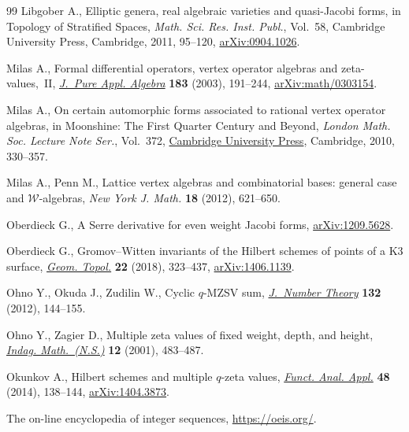 \documentclass[pdftex]{sigma}
\numberwithin{equation}{section}
\theoremstyle{definition}
\begin{document}
\begin{thebibliography}{99}
Libgober A., Elliptic genera, real algebraic varieties and quasi-{J}acobi
 forms, in Topology of Stratified Spaces, \textit{Math. Sci. Res. Inst.
 Publ.}, Vol.~58, Cambridge University Press, Cambridge, 2011, 95--120,
 \href{https://arxiv.org/abs/0904.1026}{arXiv:0904.1026}.

Milas A., Formal differential operators, vertex operator algebras and
 zeta-values,~{II},
 \href{https://doi.org/10.1016/S0022-4049(03)00036-7}{\textit{J.~Pure Appl.
 Algebra}} \textbf{183} (2003), 191--244,
 \href{https://arxiv.org/abs/math/0303154}{arXiv:math/0303154}.

Milas A., On certain automorphic forms associated to rational vertex operator
 algebras, in Moonshine: The First Quarter Century and Beyond, \textit{London
 Math. Soc. Lecture Note Ser.}, Vol.~372,
 \href{https://doi.org/10.1017/CBO9780511730054.016}{Cambridge University
 Press}, Cambridge, 2010, 330--357.

Milas A., Penn M., Lattice vertex algebras and combinatorial bases: general
 case and {$\mathcal W$}-algebras, \textit{New York J. Math.} \textbf{18}
 (2012), 621--650.

Oberdieck G., A {S}erre derivative for even weight {J}acobi forms,
 \href{https://arxiv.org/abs/1209.5628}{arXiv:1209.5628}.

Oberdieck G., Gromov--{W}itten invariants of the {H}ilbert schemes of points of
 a {K}3 surface, \href{https://doi.org/10.2140/gt.2018.22.323}{\textit{Geom.
 Topol.}} \textbf{22} (2018), 323--437,
 \href{https://arxiv.org/abs/1406.1139}{arXiv:1406.1139}.

Ohno Y., Okuda J., Zudilin W., Cyclic {$q$}-{MZSV} sum,
 \href{https://doi.org/10.1016/j.jnt.2011.08.001}{\textit{J.~Number Theory}}
 \textbf{132} (2012), 144--155.

Ohno Y., Zagier D., Multiple zeta values of fixed weight, depth, and height,
 \href{https://doi.org/10.1016/S0019-3577(01)80037-9}{\textit{Indag.
 Math.~(N.S.)}} \textbf{12} (2001), 483--487.

Okunkov A., Hilbert schemes and multiple {$q$}-zeta values,
 \href{https://doi.org/10.1007/s10688-014-0054-z}{\textit{Funct. Anal. Appl.}}
 \textbf{48} (2014), 138--144,
 \href{https://arxiv.org/abs/1404.3873}{arXiv:1404.3873}.

The on-line encyclopedia of integer sequences, \url{https://oeis.org/}.


\end{thebibliography}
\end{document}
